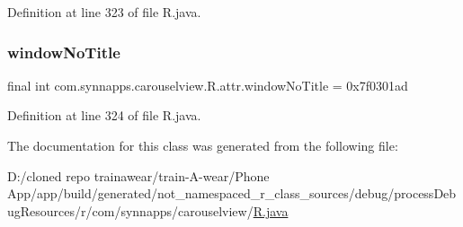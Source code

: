 Definition at line 323 of file R.\+java.

\mbox{\label{classcom_1_1synnapps_1_1carouselview_1_1_r_1_1attr_ac720f6e5c3344091e6e2da6b44180255}} 
\subsubsection{\texorpdfstring{windowNoTitle}{windowNoTitle}}
{\footnotesize\ttfamily final int com.\+synnapps.\+carouselview.\+R.\+attr.\+window\+No\+Title = 0x7f0301ad\hspace{0.3cm}{\ttfamily [static]}}



Definition at line 324 of file R.\+java.



The documentation for this class was generated from the following file\+:\begin{DoxyCompactItemize}
\item 
D\+:/cloned repo trainawear/train-\/\+A-\/wear/\+Phone App/app/build/generated/not\+\_\+namespaced\+\_\+r\+\_\+class\+\_\+sources/debug/process\+Debug\+Resources/r/com/synnapps/carouselview/\mbox{\hyperlink{process_debug_resources_2r_2com_2synnapps_2carouselview_2_r_8java}{R.\+java}}\end{DoxyCompactItemize}
